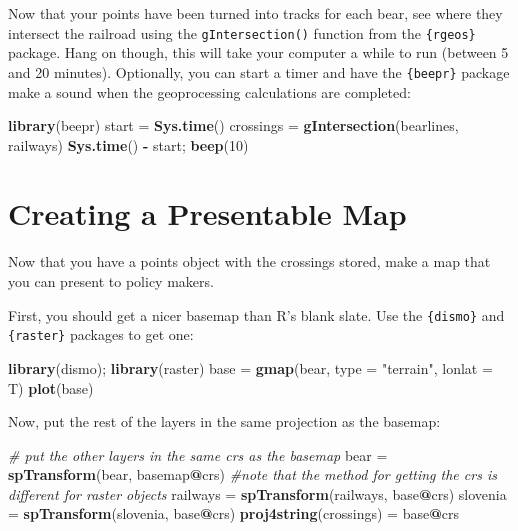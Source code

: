 \documentclass[]{book}
\newenvironment{Shaded}{\begin{snugshade}}{\end{snugshade}}
\newcommand{\KeywordTok}[1]{\textcolor[rgb]{0.13,0.29,0.53}{\textbf{#1}}}
\newcommand{\DataTypeTok}[1]{\textcolor[rgb]{0.13,0.29,0.53}{#1}}
\newcommand{\DecValTok}[1]{\textcolor[rgb]{0.00,0.00,0.81}{#1}}
\newcommand{\StringTok}[1]{\textcolor[rgb]{0.31,0.60,0.02}{#1}}
\newcommand{\CommentTok}[1]{\textcolor[rgb]{0.56,0.35,0.01}{\textit{#1}}}
\newcommand{\OperatorTok}[1]{\textcolor[rgb]{0.81,0.36,0.00}{\textbf{#1}}}
\newcommand{\NormalTok}[1]{#1}
\theoremstyle{definition}
\theoremstyle{definition}
\theoremstyle{definition}
\theoremstyle{remark}
\begin{document}
Now that your points have been turned into tracks for each bear, see
where they intersect the railroad using the \texttt{gIntersection()}
function from the \texttt{\{rgeos\}} package. Hang on though, this will
take your computer a while to run (between 5 and 20 minutes).
Optionally, you can start a timer and have the \texttt{\{beepr\}}
package \citep{R-beepr} make a sound when the geoprocessing calculations
are completed:

\begin{Shaded}
\begin{Highlighting}[]
\KeywordTok{library}\NormalTok{(beepr)}
\NormalTok{start =}\StringTok{ }\KeywordTok{Sys.time}\NormalTok{()}
\NormalTok{crossings =}\StringTok{ }\KeywordTok{gIntersection}\NormalTok{(bearlines, railways) }
\KeywordTok{Sys.time}\NormalTok{() }\OperatorTok{-}\StringTok{ }\NormalTok{start; }\KeywordTok{beep}\NormalTok{(}\DecValTok{10}\NormalTok{)}
\end{Highlighting}
\end{Shaded}

\section{Creating a Presentable Map}\label{base-maps}

Now that you have a points object with the crossings stored, make a map
that you can present to policy makers.

First, you should get a nicer basemap than R's blank slate. Use the
\texttt{\{dismo\}} \citep{R-dismo} and \texttt{\{raster\}}
\citep{R-raster} packages to get one:

\begin{Shaded}
\begin{Highlighting}[]
\KeywordTok{library}\NormalTok{(dismo); }\KeywordTok{library}\NormalTok{(raster)}
\NormalTok{base =}\StringTok{ }\KeywordTok{gmap}\NormalTok{(bear, }\DataTypeTok{type =} \StringTok{"terrain"}\NormalTok{, }\DataTypeTok{lonlat =}\NormalTok{ T)}
\KeywordTok{plot}\NormalTok{(base)}
\end{Highlighting}
\end{Shaded}

Now, put the rest of the layers in the same projection as the basemap:

\begin{Shaded}
\begin{Highlighting}[]
\CommentTok{# put the other layers in the same crs as the basemap}
\NormalTok{bear =}\StringTok{ }\KeywordTok{spTransform}\NormalTok{(bear, basemap}\OperatorTok{@}\NormalTok{crs) }\CommentTok{#note that the method for getting the crs is different for raster objects}
\NormalTok{railways =}\StringTok{ }\KeywordTok{spTransform}\NormalTok{(railways, base}\OperatorTok{@}\NormalTok{crs)}
\NormalTok{slovenia =}\StringTok{ }\KeywordTok{spTransform}\NormalTok{(slovenia, base}\OperatorTok{@}\NormalTok{crs)}
\KeywordTok{proj4string}\NormalTok{(crossings) =}\StringTok{ }\NormalTok{base}\OperatorTok{@}\NormalTok{crs}
\end{Highlighting}
\end{Shaded}
\end{document}
